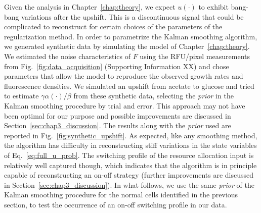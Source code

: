 Given the analysis in Chapter~\ref{chap:theory}, we expect $u(\cdot)$ to exhibit bang-bang variations after the upshift.
This is a discontinuous signal that could be complicated to reconstruct for certain choices of the parameters of the regularization method.
In order to parametrize the Kalman smoothing algorithm, we generated synthetic data by simulating the model of Chapter~\ref{chap:theory}.
We estimated the noise characteristics of $F$ using the RFU/pixel measurements from Fig.~\ref{fig:data_acquisition} (Supporting Information XX) and chose parameters that allow the model to reproduce the observed growth rates and fluorescence densities.
We simulated an upshift from acetate to glucose and tried to estimate $\gamma \alpha(\cdot) / \beta$ from these synthetic data, selecting the \textit{prior} in the Kalman smoothing procedure by trial and error.
This approach may not have been optimal for our purpose and possible improvements are discussed in Section~\ref{sec:chap3_discussion}.
The results along with the \textit{prior} used are reported in Fig.~\ref{fig:synthetic_upshift}.
As expected, like any smoothing method, the algorithm has difficulty in reconstructing stiff variations in the state variables of Eq.~\ref{eq:full_u_prob}.
The switching profile of the resource allocation input is relatively well captured though, which indicates that the algorithm is in principle capable of reconstructing an on-off strategy (further improvements are discussed in Section~\ref{sec:chap3_discussion}).
In what follows, we use the same \textit{prior} of the Kalman smoothing procedure for the normal cells identified in the previous section, to test the occurrence of an on-off switching profile in our data.

